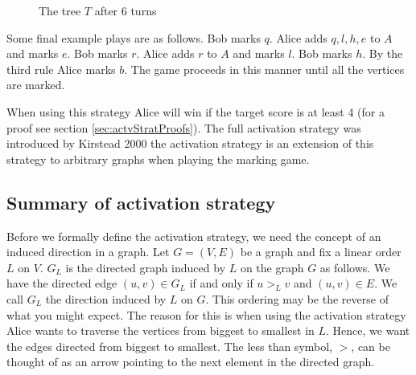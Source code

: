 \begin{figure}[H]
     \caption{The tree $T$ after 6 turns}
     \label{fig:actvStrateg_2}
 \end{figure}
%
Some final example plays are as follows. Bob marks $q$. Alice adds $q,l,h,e$ to $A$ and marks $e$. Bob marks $r$. Alice adds $r$ to $A$ and marks $l$. Bob marks $h$. By the third rule Alice marks $b$. The game proceeds in this manner until all the vertices are marked. 

When using this strategy Alice will win if the target score is at least 4 (for a proof see section \ref{sec:actvStratProofs}). The full activation strategy was introduced by Kirstead 2000 \cite{KIERSTEAD2000} the activation strategy is an extension of this strategy to arbitrary graphs when playing the marking game.
 
\subsection{Summary of activation strategy}

Before we formally define the activation strategy, we need the concept of an induced direction in a graph. Let $G=(V,E)$ be a graph and fix a linear order $L$ on $V$. $G_L$ is the directed graph induced by $L$ on the graph $G$ as follows. We have the directed edge $(u,v)\in G_L$ if and only if $u>_Lv$ and $(u,v)\in E$. We call $G_L$ the direction induced by $L$ on $G$. This ordering may be the reverse of what you might expect. The reason for this is when using the activation strategy Alice wants to traverse the vertices from biggest to smallest in $L$. Hence, we want the edges directed from biggest to smallest. The less than symbol, $>$, can be thought of as an arrow pointing to the next element in the directed graph.

